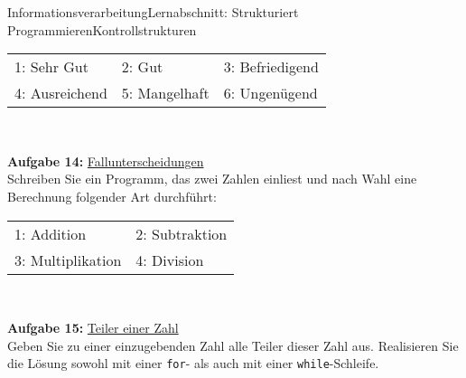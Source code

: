 \documentclass[oneside,openany,headings=optiontotoc,11pt,numbers=noenddot]{scrreprt}
\begin{document}
\begin{worksheet}{Informationsverarbeitung}{Lernabschnitt: Strukturiert Programmieren}{Kontrollstrukturen}
\begin{framed}
			\begin{tabular}{lll}
				1: Sehr Gut & 2: Gut & 3: Befriedigend\\
				4: Ausreichend & 5: Mangelhaft & 6: Ungenügend
			\end{tabular}\\
			\par\noindent
			\textbf{Aufgabe 14:} \underline{Fallunterscheidungen}\\
			Schreiben Sie ein Programm, das zwei Zahlen einliest und nach Wahl eine Berechnung folgender Art durchführt:\\
			\begin{tabular}{ll}
				1: Addition & 2: Subtraktion\\
				3: Multiplikation & 4: Division
			\end{tabular}\\
			\par\noindent
			\textbf{Aufgabe 15:} \underline{Teiler einer Zahl}\\
			Geben Sie zu einer einzugebenden Zahl alle Teiler dieser Zahl aus. Realisieren Sie die Lösung sowohl mit einer \lstinline[style=JavaInputStyle]|for|- als auch mit einer \lstinline[style=JavaInputStyle]|while|-Schleife.
		\end{framed}
	\end{worksheet}
\end{document}
